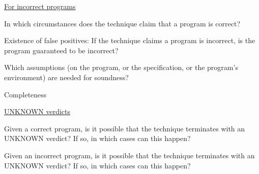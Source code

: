 \documentclass[a4paper]{article}
\begin{document}
\begin{minipage}[t]{0.16\linewidth}
\begin{betterlist}
\begin{betterlist}
\begin{betterlist}
			\end{betterlist}
			\item \underline{For incorrect programs}
			\begin{betterlist}
				\item In which circumstances does the technique claim that a program is correct?

				\item Existence of false positives: If the technique claims a program is incorrect, is the program guaranteed to be incorrect?

			\end{betterlist}
			\item Which assumptions (on the program, or the specification, or the program’s environment) are needed for soundness?
				\framebox[0.95\textwidth][l]{\parbox{0.91\textwidth}{
  \begin{betterlist}
      \item TODO
  \end{betterlist}
					}}
		\end{betterlist}
		\item \alert{Completeness}
		\begin{betterlist}
			\item \underline{UNKNOWN verdicts}
			\begin{betterlist}
				\item Given a correct program, is it possible that the technique terminates with an UNKNOWN verdict? If so, in which cases can this happen?

				\item Given an incorrect program, is it possible that the technique terminates with an UNKNOWN verdict? If so, in which cases can this happen?


\end{betterlist}
\end{betterlist}
\end{betterlist}
\end{minipage}
\end{document}
